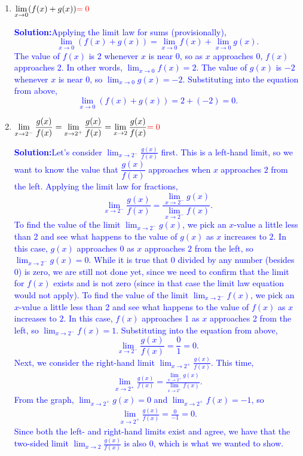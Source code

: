 \documentclass[letterpaper,11pt]{article}
\def\ds{\displaystyle}
\newcommand{\tsol}[1]{\textcolor{red}{#1}}
\newcommand{\sol}[1]{\textcolor{blue}{\textbf{Solution:}}\quad \textcolor{blue}{#1}}
\newcommand{\tsol}[1]{\textcolor{white}{#1}}
\newcommand{\sol}[1]{\vfill}
\begin{document}
\begin{enumerate}
\item $\ds \lim_{x\rightarrow 0} (f(x)+g(x))\tsol{=0}$

\sol{Applying the limit law for sums (provisionally),
\[
  \lim_{x \to 0} (f(x) + g(x)) = \lim_{x \to 0} f(x) + \lim_{x \to 0} g(x).
\]
The value of $f(x)$ is 2 whenever $x$ is near $0$, so as $x$ approaches $0$, $f(x)$ approaches 2. In other words,
$\ds \lim_{x \to 0} f(x) = 2$.
The value of $g(x)$ is $-2$ whenever $x$ is near $0$, so $\ds \lim_{x \to 0} g(x) = -2$.
Substituting into the equation from above,
\[
   \lim_{x \to 0} (f(x) + g(x)) = 2 + (-2) = 0.
\]
}

\item $\ds \lim_{x\rightarrow 2^-} \frac{g(x)}{f(x)}=\lim_{x\rightarrow 2^+} \frac{g(x)}{f(x)}=\lim_{x\rightarrow 2} \frac{g(x)}{f(x)}\tsol{=0}$

\sol{Let's consider $\ds \lim_{x \to 2^-} \frac{g(x)}{f(x)}$ first. This is a left-hand limit, so we want to know the value that
$\dfrac{g(x)}{f(x)}$ approaches when $x$ approaches $2$ from the left. Applying the limit law for fractions,
\[
   \lim_{x \to 2^-} \frac{g(x)}{f(x)} = \frac{\lim\limits_{x \to 2^-} g(x)}{\lim\limits_{x \to 2^-} f(x)}.
\]
To find the value of the limit $\ds \lim_{x \to 2^-} g(x)$, we pick an $x$-value a little less than 2 and see what happens
to the value of $g(x)$ as $x$ increases to $2$. In this case, $g(x)$ approaches 0 as $x$ approaches $2$ from the left,
so $\ds \lim_{x \to 2^-} g(x) = 0$. While it is true that $0$ divided by any number (besides 0) is zero, we are still not done
yet, since we need to confirm that the limit for $f(x)$ exists and is not zero (since in that case the limit law equation would not apply).
To find the value of the limit $\ds \lim_{x \to 2^-} f(x)$, we pick an $x$-value a little less than 2 and see what happens
to the value of $f(x)$ as $x$ increases to $2$. In this case, $f(x)$ approaches 1 as $x$ approaches 2 from the left, so
$\ds \lim_{x \to 2^-} f(x) = 1$. Substituting into the equation from above,
\[
  \lim_{x \to 2^-} \frac{g(x)}{f(x)} = \frac{0}{1} = 0.
\]
Next, we consider the right-hand limit $\ds \lim_{x \to 2^+} \frac{g(x)}{f(x)}$. This time,
\begin{align*}
  \lim_{x \to 2^+} \frac{g(x)}{f(x)} = \frac{\lim\limits_{x \to 2^+} g(x)}{\lim\limits_{x \to 2^+} f(x)}.
\end{align*}
From the graph, $\ds \lim_{x \to 2^+} g(x) = 0$ and $\ds \lim_{x \to 2^+} f(x) = -1$, so
\begin{align*}
  \lim_{x \to 2^+} \frac{g(x)}{f(x)} = \frac{0}{-1} = 0.
\end{align*}
Since both the left- and right-hand limits exist and agree, we have that the two-sided limit
$\ds \lim_{x \to 2} \frac{g(x)}{f(x)}$ is also $0$, which is what we wanted to show.
}


\end{enumerate}
\end{document}
